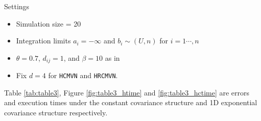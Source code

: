 \begin{frame}{\subsecname}

	\begin{block}{Settings}
		\begin{itemize}
			\item Simulation size = 20
			\item Integration limits $a_i=-\infty$ and $b_i\sim(U,n)$ for $i=1\cdots,n$
			\item $\theta=0.7$, $d_{ij} = 1$, and $\beta=10$ as in \citet{cao2019hierarchical}
			\item Fix $d=4$ for \texttt{HCMVN} and \texttt{HRCMVN}.
		\end{itemize}
	\end{block}

	Table \ref{tab:table3}, Figure \ref{fig:table3_htime} and \ref{fig:table3_hctime} are errors and execution times under the constant covariance structure and 1D exponential covariance structure respectively. 
\end{frame}

\begin{frame}{\subsecname}

	\begin{table}[!h]
		\centering	
		\caption{Relative errors under the constant covariance structure and 1D exponential covariance structure}
		\label{tab:table3}
	\end{table}
	
\end{frame}


